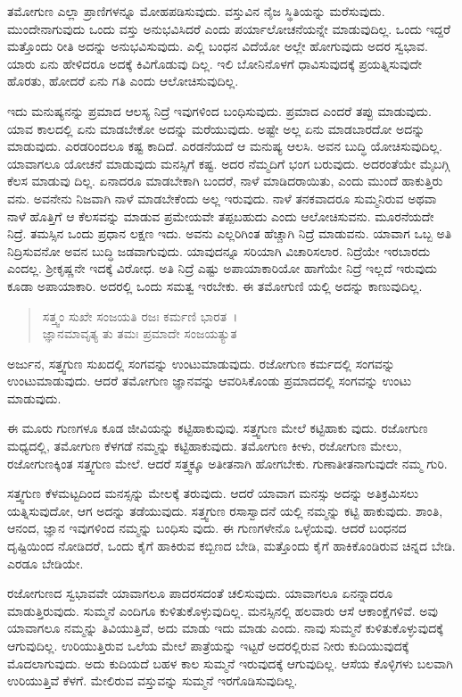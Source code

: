 ತಮೋಗುಣ ಎಲ್ಲಾ ಪ್ರಾಣಿಗಳನ್ನೂ ಮೋಹಪಡಿಸುವುದು. ವಸ್ತುವಿನ ನೈಜ ಸ್ಥಿತಿಯನ್ನು ಮರೆಸುವುದು. ಮುಂದೇನಾಗುವುದು ಒಂದು ವಸ್ತು ಅನುಭವಿಸಿದರೆ ಎಂದು ಪರ್ಯಾಲೋಚನೆಯನ್ನೇ ಮಾಡುವುದಿಲ್ಲ. ಒಂದು ಇದ್ದರೆ ಮತ್ತೊಂದು ರೀತಿ ಅದನ್ನು ಅನುಭವಿಸುವುದು. ಎಲ್ಲಿ ಬಂಧನ ವಿದೆಯೋ ಅಲ್ಲೇ ಹೋಗುವುದು ಅದರ ಸ್ವಭಾವ. ಯಾರು ಏನು ಹೇಳಿದರೂ ಅದಕ್ಕೆ ಕಿವಿಗೊಡುವು ದಿಲ್ಲ. ಇಲಿ ಬೋನಿನೊಳಗೆ ಧಾವಿಸುವುದಕ್ಕೆ ಪ್ರಯತ್ನಿಸುವುದೇ ಹೊರತು, ಹೋದರೆ ಏನು ಗತಿ ಎಂದು ಆಲೋಚಿಸುವುದಿಲ್ಲ.

ಇದು ಮನುಷ್ಯನನ್ನು ಪ್ರಮಾದ ಆಲಸ್ಯ ನಿದ್ರೆ ಇವುಗಳಿಂದ ಬಂಧಿಸುವುದು. ಪ್ರಮಾದ ಎಂದರೆ ತಪ್ಪು ಮಾಡುವುದು. ಯಾವ ಕಾಲದಲ್ಲಿ ಏನು ಮಾಡಬೇಕೋ ಅದನ್ನು ಮರೆಯುವುದು. ಅಷ್ಟೇ ಅಲ್ಲ ಏನು ಮಾಡಬಾರದೋ ಅದನ್ನು ಮಾಡುವುದು. ಎರಡರಿಂದಲೂ ಕಷ್ಟ ಕಾದಿದೆ. ಎರಡನೆಯದೆ ಆ ಮನುಷ್ಯ ಆಲಸಿ. ಅವನ ಬುದ್ಧಿ ಯೋಚಿಸುವುದಿಲ್ಲ. ಯಾವಾಗಲೂ ಯೋಚನೆ ಮಾಡುವುದು ಮನಸ್ಸಿಗೆ ಕಷ್ಟ. ಅದರ ನೆಮ್ಮದಿಗೆ ಭಂಗ ಬರುವುದು. ಅದರಂತೆಯೇ ಮೈಬಗ್ಗಿ ಕೆಲಸ ಮಾಡುವು ದಿಲ್ಲ. ಏನಾದರೂ ಮಾಡಬೇಕಾಗಿ ಬಂದರೆ, ನಾಳೆ ಮಾಡಿದರಾಯಿತು, ಎಂದು ಮುಂದೆ ಹಾಕುತ್ತಿರು ವನು. ಅವನೇನು ನಿಜವಾಗಿ ನಾಳೆ ಮಾಡಬೇಕೆಂದು ಅಲ್ಲ ಇರುವುದು. ನಾಳೆ ತನಕವಾದರೂ ಸುಮ್ಮನಿರುವ ಅಥವಾ ನಾಳೆ ಹೊತ್ತಿಗೆ ಆ ಕೆಲಸವನ್ನು ಮಾಡುವ ಪ್ರಮೇಯವೇ ತಪ್ಪಬಹುದು ಎಂದು ಆಲೋಚಿಸುವನು. ಮೂರನೆಯದೇ ನಿದ್ರೆ. ತಮಸ್ಸಿನ ಒಂದು ಪ್ರಧಾನ ಲಕ್ಷಣ ಇದು. ಅವನು ಎಲ್ಲರಿಗಿಂತ ಹೆಚ್ಚಾಗಿ ನಿದ್ರೆ ಮಾಡುವನು. ಯಾವಾಗ ಒಬ್ಬ ಅತಿ ನಿದ್ರಿಸುವನೋ ಅವನ ಬುದ್ಧಿ ಜಡವಾಗುವುದು. ಯಾವುದನ್ನೂ ಸರಿಯಾಗಿ ವಿಚಾರಿಸಲಾರ. ನಿದ್ರೆಯೇ ಇರಬಾರದು ಎಂದಲ್ಲ. ಶ‍್ರೀಕೃಷ್ಣನೇ ಇದಕ್ಕೆ ವಿರೋಧ. ಅತಿ ನಿದ್ರೆ ಎಷ್ಟು ಅಪಾಯಾಕಾರಿಯೋ ಹಾಗೆಯೇ ನಿದ್ರೆ ಇಲ್ಲದೆ ಇರುವುದು ಕೂಡಾ ಅಪಾಯಾಕಾರಿ. ಅದರಲ್ಲಿ ಒಂದು ಸಮತ್ವ ಇರಬೇಕು. ಈ ತಮೋಗುಣಿ ಯಲ್ಲಿ ಅದನ್ನು ಕಾಣುವುದಿಲ್ಲ.

\begin{verse}
ಸತ್ತ್ವಂ ಸುಖೇ ಸಂಜಯತಿ ರಜಃ ಕರ್ಮಣಿ ಭಾರತ~।\\ಜ್ಞಾನಮಾವೃತ್ಯ ತು ತಮಃ ಪ್ರಮಾದೇ ಸಂಜಯತ್ಯುತ 
\end{verse}

{\small ಅರ್ಜುನ, ಸತ್ತ್ವಗುಣ ಸುಖದಲ್ಲಿ ಸಂಗವನ್ನು ಉಂಟುಮಾಡುವುದು. ರಜೋಗುಣ ಕರ್ಮದಲ್ಲಿ ಸಂಗವನ್ನು ಉಂಟುಮಾಡುವುದು. ಆದರೆ ತಮೋಗುಣ ಜ್ಞಾನವನ್ನು ಆವರಿಸಿಕೊಂಡು ಪ್ರಮಾದದಲ್ಲಿ ಸಂಗವನ್ನು ಉಂಟು ಮಾಡುವುದು.}

ಈ ಮೂರು ಗುಣಗಳೂ ಕೂಡ ಜೀವಿಯನ್ನು ಕಟ್ಟಿಹಾಕುವುವು. ಸತ್ತ್ವಗುಣ ಮೇಲೆ ಕಟ್ಟಿಹಾಕು ವುದು. ರಜೋಗುಣ ಮಧ್ಯದಲ್ಲಿ, ತಮೋಗುಣ ಕೆಳಗಡೆ ನಮ್ಮನ್ನು ಕಟ್ಟಿಹಾಕುವುದು. ತಮೋಗುಣ ಕೀಳು, ರಜೋಗುಣ ಮೇಲು, ರಜೋಗುಣಕ್ಕಿಂತ ಸತ್ತ್ವಗುಣ ಮೇಲೆ. ಆದರೆ ಸತ್ತ್ವಕ್ಕೂ ಅತೀತನಾಗಿ ಹೋಗಬೇಕು. ಗುಣಾತೀತನಾಗುವುದೇ ನಮ್ಮ ಗುರಿ.

ಸತ್ತ್ವಗುಣ ಕೆಳಮಟ್ಟದಿಂದ ಮನಸ್ಸನ್ನು ಮೇಲಕ್ಕೆ ತರುವುದು. ಆದರೆ ಯಾವಾಗ ಮನಸ್ಸು ಅದನ್ನು ಅತಿಕ್ರಮಿಸಲು ಯತ್ನಿಸುವುದೋ, ಆಗ ಅದನ್ನು ತಡೆಯುವುದು. ಸತ್ತ್ವಗುಣ ರಸಾಸ್ವಾದನೆ ಯಲ್ಲಿ ನಮ್ಮನ್ನು ಕಟ್ಟಿ ಹಾಕುವುದು. ಶಾಂತಿ, ಆನಂದ, ಜ್ಞಾನ ಇವುಗಳಿಂದ ನಮ್ಮನ್ನು ಬಂಧಿಸು ವುದು. ಈ ಗುಣಗಳೇನೊ ಒಳ್ಳೆಯವು. ಆದರೆ ಬಂಧನದ ದೃಷ್ಟಿಯಿಂದ ನೋಡಿದರೆ, ಒಂದು ಕೈಗೆ ಹಾಕಿರುವ ಕಬ್ಬಿಣದ ಬೇಡಿ, ಮತ್ತೊಂದು ಕೈಗೆ ಹಾಕಿಕೊಂಡಿರುವ ಚಿನ್ನದ ಬೇಡಿ. ಎರಡೂ ಬೇಡಿಯೇ.

ರಜೋಗುಣದ ಸ್ವಭಾವವೇ ಯಾವಾಗಲೂ ಪಾದರಸದಂತೆ ಚಲಿಸುವುದು. ಯಾವಾಗಲೂ ಏನನ್ನಾದರೂ ಮಾಡುತ್ತಿರುವುದು. ಸುಮ್ಮನೆ ಎಂದಿಗೂ ಕುಳಿತುಕೊಳ್ಳುವುದಿಲ್ಲ. ಮನಸ್ಸಿನಲ್ಲಿ ಹಲವಾರು ಆಸೆ ಆಕಾಂಕ್ಷೆಗಳಿವೆ. ಅವು ಯಾವಾಗಲೂ ನಮ್ಮನ್ನು ತಿವಿಯುತ್ತಿವೆ, ಅದು ಮಾಡು ಇದು ಮಾಡು ಎಂದು. ನಾವು ಸುಮ್ಮನೆ ಕುಳಿತುಕೊಳ್ಳುವುದಕ್ಕೆ ಆಗುವುದಿಲ್ಲ. ಉರಿಯುತ್ತಿರುವ ಒಲೆಯ ಮೇಲೆ ಪಾತ್ರೆಯನ್ನು ಇಟ್ಟರೆ ಅದರಲ್ಲಿರುವ ನೀರು ಕುದಿಯುವುದಕ್ಕೆ ಮೊದಲಾಗುವುದು. ಅದು ಕುದಿಯದೆ ಬಹಳ ಕಾಲ ಸುಮ್ಮನೆ ಇರುವುದಕ್ಕೆ ಆಗುವುದಿಲ್ಲ. ಆಸೆಯ ಕೊಳ್ಳಿಗಳು ಬಲವಾಗಿ ಉರಿಯುತ್ತಿವೆ ಕೆಳಗೆ. ಮೇಲಿರುವ ವಸ್ತುವನ್ನು ಸುಮ್ಮನೆ ಇರಗೊಡಿಸುವುದಿಲ್ಲ.

